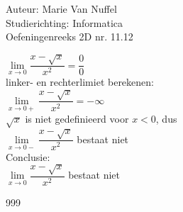 \documentclass[a4paper]{article}
\begin{document}
  
\noindent \large Auteur: Marie Van Nuffel \\
\noindent \large Studierichting: Informatica\\
\noindent \large Oefeningenreeks 2D nr. 11.12\\

\medskip

\normalsize

$\lim\limits_{x\rightarrow 0}\dfrac{x-\sqrt{x}}{x^2} = \dfrac{0}{0}$\\

linker- en rechterlimiet berekenen:\\

$\lim\limits_{x\rightarrow 0+}\dfrac{x-\sqrt{x}}{x^2} = -\infty$\\

$\sqrt{x}$ is niet gedefinieerd voor $x < 0$, dus\\

$\lim\limits_{x\rightarrow 0-}\dfrac{x-\sqrt{x}}{x^2}$ bestaat niet\\

Conclusie:\\

$\lim\limits_{x\rightarrow 0}\dfrac{x-\sqrt{x}}{x^2}$ bestaat niet\\

\begin{thebibliography}{999}
\end{thebibliography}
\end{document}
